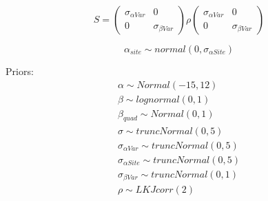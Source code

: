 \documentclass[11pt,letter]{article}
\begin{document}
\begin{equation*}
S = 
\begin{pmatrix}
\sigma_{\alpha Var} & 0 \\
0 & \sigma_{\beta Var} 
\end{pmatrix}
\rho
\begin{pmatrix}
\sigma_{\alpha Var} & 0 \\
0 & \sigma_{\beta Var} 
\end{pmatrix}
\end{equation*}

\begin{equation*}
\alpha_{site} \sim normal(0, \sigma_{\alpha Site}) 
\end{equation*}

Priors:
\begin{gather*}
\alpha \sim Normal(-15, 12)\\
\beta \sim lognormal(0,1)\\
\beta_{quad} \sim Normal(0,1)\\
\sigma \sim truncNormal(0,5)\\
\sigma_{\alpha Var} \sim truncNormal(0,5)\\
\sigma_{\alpha Site} \sim truncNormal(0,5)\\
\sigma_{\beta Var} \sim truncNormal(0,1)\\
\rho \sim LKJcorr (2)
\end{gather*}




\end{document}
